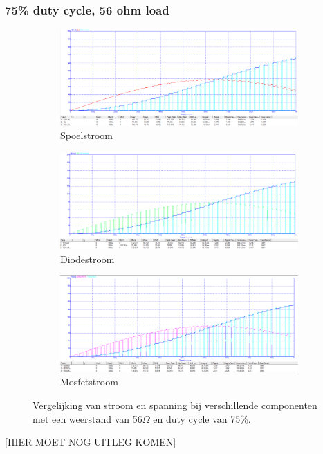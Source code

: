 \subsubsection{75\% duty cycle, 56 ohm load}

\begin{figure}[h!]
    \centering
    \begin{subfigure}[b]{0.3\linewidth}
        \centering
        \includegraphics[width=\linewidth]{img/hfd1/hfd1-75pduty-56-INDUCTOR.png}
        \caption{Spoelstroom}
        \label{fig:inductor75}
    \end{subfigure}
    \hfill
    \begin{subfigure}[b]{0.3\linewidth}
        \centering
        \includegraphics[width=\linewidth]{img/hfd1/hfd1-75pduty-56-DIODE.png}
        \caption{Diodestroom}
        \label{fig:diode75}
    \end{subfigure}
    \hfill
    \begin{subfigure}[b]{0.3\linewidth}
        \centering
        \includegraphics[width=\linewidth]{img/hfd1/hfd1-75pduty-56-DMOSFET.png}
        \caption{Mosfetstroom}
        \label{fig:mosfet75}
    \end{subfigure}
    
    \caption{Vergelijking van stroom en spanning bij verschillende componenten met een weerstand van 56\(\Omega\) en duty cycle van 75\%.}
    \label{fig:componenten75}
\end{figure}

[HIER MOET NOG UITLEG KOMEN]